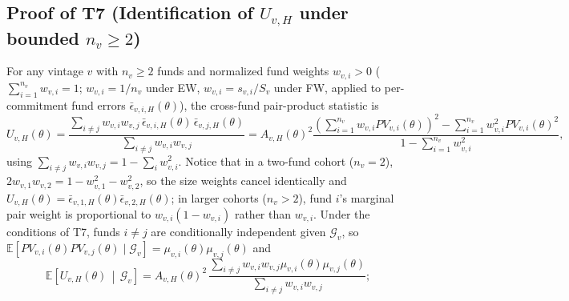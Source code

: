 \subsection{Proof of T7 (Identification of $U_{v,H}$ under bounded $n_v \ge 2$)}
\label{sec:proof_T7}

For any vintage $v$ with $n_v \ge 2$ funds and normalized fund weights $w_{v,i} > 0$ ($\sum_{i=1}^{n_v} w_{v,i} = 1$; $w_{v,i} = 1/n_v$ under EW, $w_{v,i} = s_{v,i}/S_v$ under FW, applied to per-commitment fund errors $\bar\epsilon_{v,i,H}(\theta)$), the cross-fund pair-product statistic is
\[
U_{v,H}(\theta)
= \frac{\sum_{i \neq j} w_{v,i} w_{v,j}\, \bar\epsilon_{v,i,H}(\theta)\, \bar\epsilon_{v,j,H}(\theta)}{\sum_{i \neq j} w_{v,i} w_{v,j}}
= A_{v,H}(\theta)^2 \frac{\left(\sum_{i=1}^{n_v} w_{v,i} PV_{v,i}(\theta)\right)^2 - \sum_{i=1}^{n_v} w_{v,i}^2 PV_{v,i}(\theta)^2}{1 - \sum_{i=1}^{n_v} w_{v,i}^2},
\]
using $\sum_{i\neq j}w_{v,i}w_{v,j} = 1 - \sum_i w_{v,i}^2$. Notice that in a two-fund cohort ($n_v = 2$), $2 w_{v,1} w_{v,2} = 1 - w_{v,1}^2 - w_{v,2}^2$, so the size weights cancel identically and $U_{v,H}(\theta) = \bar\epsilon_{v,1,H}(\theta)\bar\epsilon_{v,2,H}(\theta)$; in larger cohorts ($n_v > 2$), fund $i$'s marginal pair weight is proportional to $w_{v,i}(1 - w_{v,i})$ rather than $w_{v,i}$. Under the conditions of T7, funds $i \neq j$ are conditionally independent given $\mathcal{G}_v$, so $\mathbb{E}[PV_{v,i}(\theta)PV_{v,j}(\theta)\mid\mathcal{G}_v] = \mu_{v,i}(\theta)\mu_{v,j}(\theta)$ and
\[
\mathbb{E}\!\left[U_{v,H}(\theta)\,\middle|\,\mathcal{G}_v\right]
= A_{v,H}(\theta)^2\,
  \frac{\sum_{i \neq j} w_{v,i} w_{v,j} \mu_{v,i}(\theta)\mu_{v,j}(\theta)}{\sum_{i \neq j} w_{v,i} w_{v,j}};
\]
